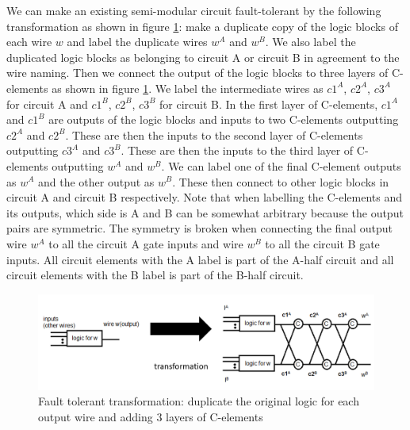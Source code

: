 \documentclass[12pt]{report}
\begin{document}
We can make an existing semi-modular circuit fault-tolerant by the following transformation as shown in figure \ref{fig:dupscheme}: make a duplicate copy of the logic blocks of each wire $w$ and label the duplicate wires $w^A$ and $w^B$.  We also label the duplicated logic blocks as belonging to circuit A or circuit B in agreement to the wire naming.  Then we connect the output of the logic blocks to three layers of C-elements as shown in figure \ref{fig:dupscheme}.  We label the intermediate wires as $c1^A$, $c2^A$, $c3^A$ for circuit A and $c1^B$, $c2^B$, $c3^B$ for circuit B.  In the first layer of C-elements, $c1^A$ and $c1^B$ are outputs of the logic blocks and inputs to two C-elements outputting $c2^A$ and $c2^B$.  These are then the inputs to the second layer of C-elements outputting $c3^A$ and $c3^B$.  These are then the inputs to the third layer of C-elements outputting $w^A$ and $w^B$.  We can label one of the final C-element outputs as $w^A$ and the other output as $w^B$.  These then connect to other logic blocks in circuit A and circuit B respectively.  Note that when labelling the C-elements and its outputs, which side is A and B can be somewhat arbitrary because the output pairs are symmetric.  The symmetry is broken when connecting the final output wire $w^A$ to all the circuit A gate inputs and wire $w^B$ to all the circuit B gate inputs.  All circuit elements with the A label is part of the A-half circuit and all circuit elements with the B label is part of the B-half circuit.\\%
\begin{figure}
  \centering
    \includegraphics[width=\textwidth]{circuitforproof3}
  \caption{Fault tolerant transformation: duplicate the original logic for each output wire and adding 3 layers of C-elements}
  \label{fig:dupscheme}
\end{figure}
\end{document}
